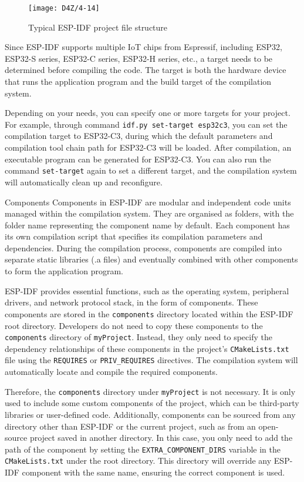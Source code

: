 \documentclass[a4paper,12pt]{book}
\begin{document}
\begin{figure}[h!]
    \centering
    \texttt{[image: D4Z/4-14]}
    \caption{Typical ESP-IDF project file structure}
    \label{Typical ESP-IDF project file structure}
\end{figure}

Since ESP-IDF supports multiple IoT chips from Espressif, including ESP32, ESP32-S series, ESP32-C series, ESP32-H series, etc., a target needs to be determined before compiling the code. The target is both the hardware device that runs the application program and the build target of the compilation system.

Depending on your needs, you can specify one or more targets for your project. For example, through command \verb|idf.py set-target esp32c3|, you can set the compilation target to ESP32-C3, during which the default parameters and compilation tool chain path for ESP32-C3 will be loaded. After compilation, an executable program can be generated for ESP32-C3. You can also run the command \verb|set-target| again to set a different target, and the compilation system will automatically clean up and reconfigure.

\begin{term}{Components}
    Components in ESP-IDF are modular and independent code units managed within the compilation system. They are organised as folders, with the folder name representing the component name by default. Each component has its own compilation script that specifies its compilation parameters and dependencies. During the compilation process, components are compiled into separate static libraries (.a files) and eventually combined with other components to form the application program.

    \parskip 6pt
    ESP-IDF provides essential functions, such as the operating system, peripheral drivers, and network protocol stack, in the form of components. These components are stored in the \verb|components| directory located within the ESP-IDF root directory. Developers do not need to copy these components to the \verb|components| directory of \verb|myProject|. Instead, they only need to specify the dependency relationships of these components in the project’s \verb|CMakeLists.txt| file using the \verb|REQUIRES| or \verb|PRIV_REQUIRES| directives. The compilation system will automatically locate and compile the required components.

    Therefore, the \verb|components| directory under \verb|myProject| is not necessary. It is only used to include some custom components of the project, which can be third-party libraries or user-defined code. Additionally, components can be sourced from any directory other than ESP-IDF or the current project, such as from an open-source project saved in another directory. In this case, you only need to add the path of the component by setting the \verb|EXTRA_COMPONENT_DIRS| variable in the \verb|CMakeLists.txt| under the root directory. This directory will override any ESP-IDF component with the same name, ensuring the correct component is used.
\end{term}
\end{document}
